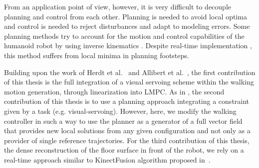 From an application point of view, however, it is very difficult to decouple planning and control from each other. Planning is needed to avoid local optima and control is needed to reject disturbances and adapt to modeling errors. Some planning methods try to account for the motion and control capabilities of the humanoid robot by using inverse kinematics \citep{kanoun:ijrr:2011}. Despite real-time implementation \citep{Dang:ichr:2011}, this method suffers from local minima in planning footsteps.

Building upon the work of Herdt et al.~\citep{HerdtAR2010} and Allibert et al.~\citep{Allibert2010}, the first contribution of this thesis is the full integration of a visual servoing scheme within the walking motion generation, through linearization into LMPC. As in \citep{Vahrenkamp:IROS:2009}, the second contribution of this thesis is to use a planning approach integrating a constraint given by a task (e.g. visual-servoing). However, here, we modify the walking controller in such a way to use the planner as a generator of a full vector field that provides new local solutions from any given configuration and not only as a provider of single reference trajectories. For the third contribution of this thesis, the dense reconstruction of the floor surface in front of the robot, we rely on a real-time approach similar to KinectFusion algorithm proposed in~\citep{Newcombe2011}.